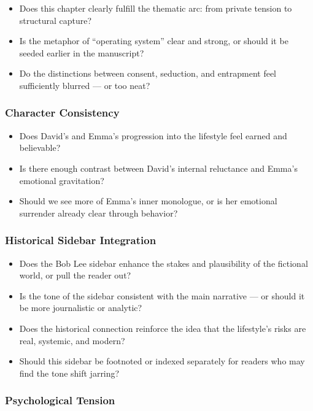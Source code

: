 \begin{itemize}
  \item Does this chapter clearly fulfill the thematic arc: from private tension to structural capture?
  \item Is the metaphor of ``operating system'' clear and strong, or should it be seeded earlier in the manuscript?
  \item Do the distinctions between consent, seduction, and entrapment feel sufficiently blurred — or too neat?
\end{itemize}

\subsubsection*{Character Consistency}

\begin{itemize}
  \item Does David’s and Emma’s progression into the lifestyle feel earned and believable?
  \item Is there enough contrast between David’s internal reluctance and Emma’s emotional gravitation?
  \item Should we see more of Emma’s inner monologue, or is her emotional surrender already clear through behavior?
\end{itemize}

\subsubsection*{Historical Sidebar Integration}

\begin{itemize}
  \item Does the Bob Lee sidebar enhance the stakes and plausibility of the fictional world, or pull the reader out?
  \item Is the tone of the sidebar consistent with the main narrative — or should it be more journalistic or analytic?
  \item Does the historical connection reinforce the idea that the lifestyle’s risks are real, systemic, and modern?
  \item Should this sidebar be footnoted or indexed separately for readers who may find the tone shift jarring?
\end{itemize}

\subsubsection*{Psychological Tension}


